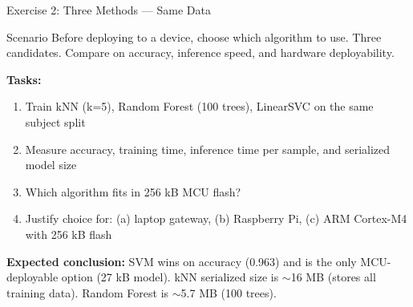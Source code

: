\documentclass[aspectratio=169,11pt]{beamer}
\begin{document}
\begin{frame}{Exercise 2: Three Methods --- Same Data}
    \begin{block}{Scenario}
        Before deploying to a device, choose which algorithm to use. Three candidates. Compare on accuracy, inference speed, and hardware deployability.
    \end{block}

    \vspace{0.2cm}
    \textbf{Tasks:}
    \begin{enumerate}
        \item Train kNN (k=5), Random Forest (100 trees), LinearSVC on the same subject split
        \item Measure accuracy, training time, inference time per sample, and serialized model size
        \item Which algorithm fits in 256 kB MCU flash?
        \item Justify choice for: (a) laptop gateway, (b) Raspberry Pi, (c) ARM Cortex-M4 with 256 kB flash
    \end{enumerate}

    \vspace{0.1cm}
    \textbf{Expected conclusion:} SVM wins on accuracy (0.963) and is the only MCU-deployable option (27 kB model). kNN serialized size is $\sim$16 MB (stores all training data). Random Forest is $\sim$5.7 MB (100 trees).
\end{frame}
\end{document}
